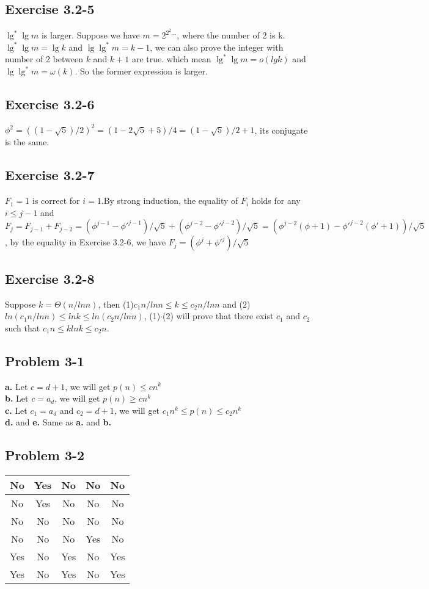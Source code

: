 \documentclass[12pt]{article}
\theoremstyle{definition}
\theoremstyle{remark}
\begin{document}
\subsection*{Exercise 3.2-5}
$\lg^*\lg m$ is larger. Suppose we have $m=2^{2^2...}$, where the number of 2 is k. $\lg^*\lg{m}=\lg{k}$ and $\lg\lg^*m=k-1$, we can also prove the integer with number of 2 between $k$ and $k+1$ are true. which mean $\lg^*\lg{m}=o(lgk)$ and $\lg\lg^*m=\omega(k)$. So the former expression is larger.
\subsection*{Exercise 3.2-6}
$\phi^2=((1-\sqrt{5})/2)^2=(1-2\sqrt{5}+5)/4=(1-\sqrt{5})/2+1$, its conjugate is the same.
\subsection*{Exercise 3.2-7}
$F_1=1$ is correct for $i=1$.By strong induction, the equality of $F_i$ holds for any $i\le j-1$ and $F_{j}=F_{j-1}+F_{j-2}=(\phi^{j-1}-\phi'^{j-1})/\sqrt{5}+(\phi^{j-2}-\phi'^{j-2})/\sqrt{5}=(\phi^{j-2}(\phi+1)-\phi'^{j-2}(\phi'+1))/\sqrt{5}$, by the equality in Exercise 3.2-6, we have $F_{j}=(\phi^j+\phi'^j)/\sqrt{5}$
\subsection*{Exercise 3.2-8}
Suppose $k=\Theta(n/lnn)$, then (1)$c_1n/lnn\le k\le c_2n/lnn$ and (2)$ln(c_1n/lnn)\le lnk\le ln(c_2n/lnn)$, (1)$\cdot$(2) will prove that there exist $c_1$ and $c_2$ such that $c_1n\le klnk\le c_2n$.
\subsection*{Problem 3-1}
\textbf{a.} Let $c=d+1$, we will get $p(n)\le cn^k$\\
\textbf{b.} Let $c=a_d$, we will get $p(n)\ge cn^k$\\
\textbf{c.} Let $c_1=a_d$ and $c_2=d+1$, we will get $c_1n^k\le p(n)\le c_2n^k$\\
\textbf{d.} and \textbf{e.} Same as \textbf{a.} and \textbf{b.}
\subsection*{Problem 3-2}
\begin{tabular}{|c|c|c|c|c|}\hline
No & Yes & No & No & No\\ \hline
No & Yes & No & No & No\\ \hline
No & No & No & No & No\\ \hline
No & No & No & Yes & No\\ \hline
Yes & No & Yes & No & Yes\\ \hline
Yes & No & Yes & No & Yes\\ \hline
\end{tabular}
\end{document}
